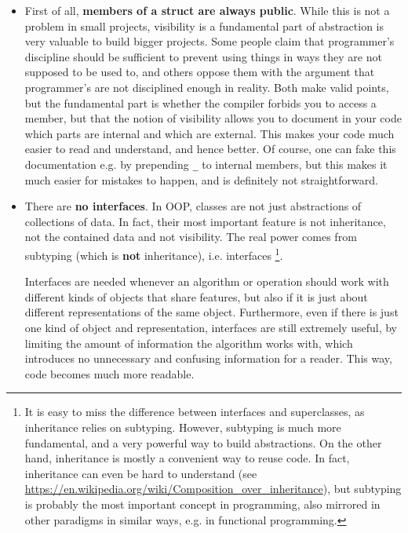 \documentclass{scrartcl}
\begin{document}
\begin{itemize}
    \item First of all, \textbf{members of a struct are always public}.
    While this is not a problem in small projects, visibility is a fundamental part of abstraction is very valuable to build bigger projects.
    Some people claim that programmer's discipline should be sufficient to prevent using things in ways they are not supposed to be used to, and others oppose them with the argument that programmer's are not disciplined enough in reality.
    Both make valid points, but the fundamental part is whether the compiler forbids you to access a member, but that the notion of visibility allows you to document in your code which parts are internal and which are external.
    This makes your code much easier to read and understand, and hence better.
    Of course, one can fake this documentation e.g. by prepending \lstinline{_} to internal members, but this makes it much easier for mistakes to happen, and is definitely not straightforward.
    \item There are \textbf{no interfaces}.
    In OOP, classes are not just abstractions of collections of data. 
    In fact, their most important feature is not inheritance, not the contained data and not visibility.
    The real power comes from subtyping (which is \textbf{not} inheritance), i.e. interfaces
    \footnote{It is easy to miss the difference between interfaces and superclasses, as inheritance relies on subtyping. 
    However, subtyping is much more fundamental, and a very powerful way to build abstractions. 
    On the other hand, inheritance is mostly a convenient way to reuse code.
    In fact, inheritance can even be hard to understand (see \href{https://en.wikipedia.org/wiki/Composition_over_inheritance}{https://en.wikipedia.org/wiki/Composition\_over\_inheritance}), but subtyping is probably the most important concept in programming, also mirrored in other paradigms in similar ways, e.g. in functional programming.}.
    
    Interfaces are needed whenever an algorithm or operation should work with different kinds of objects that share features, but also if it is just about different representations of the same object.
    Furthermore, even if there is just one kind of object and representation, interfaces are still extremely useful, by limiting the amount of information the algorithm works with, which introduces no unnecessary and confusing information for a reader.
    This way, code becomes much more readable.


\end{itemize}
\end{document}
